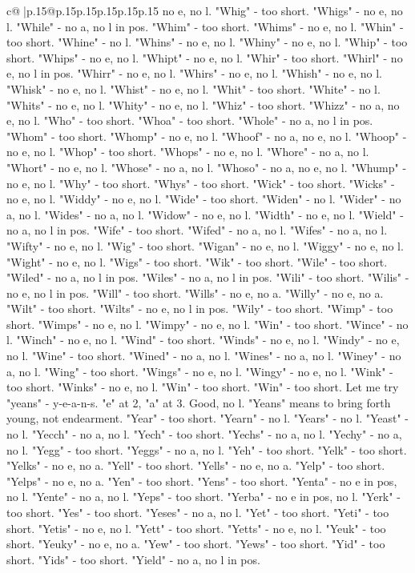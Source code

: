 \documentclass{article}
\begin{document}
{\begin{supertabular}{c@{$\;$}|p{.15\linewidth}@{}p{.15\linewidth}p{.15\linewidth}p{.15\linewidth}p{.15\linewidth}p{.15\linewidth}}
{{{no e, no l. "Whig" {-} too short. "Whigs" {-} no e, no l. "While" {-} no a, no l in pos. "Whim" {-} too short. "Whims" {-} no e, no l. "Whin" {-} too short. "Whine" {-} no l. "Whins" {-} no e, no l. "Whiny" {-} no e, no l. "Whip" {-} too short. "Whips" {-} no e, no l. "Whipt" {-} no e, no l. "Whir" {-} too short. "Whirl" {-} no e, no l in pos. "Whirr" {-} no e, no l. "Whirs" {-} no e, no l. "Whish" {-} no e, no l. "Whisk" {-} no e, no l. "Whist" {-} no e, no l. "Whit" {-} too short. "White" {-} no l. "Whits" {-} no e, no l. "Whity" {-} no e, no l. "Whiz" {-} too short. "Whizz" {-} no a, no e, no l. "Who" {-} too short. "Whoa" {-} too short. "Whole" {-} no a, no l in pos. "Whom" {-} too short. "Whomp" {-} no e, no l. "Whoof" {-} no a, no e, no l. "Whoop" {-} no e, no l. "Whop" {-} too short. "Whops" {-} no e, no l. "Whore" {-} no a, no l. "Whort" {-} no e, no l. "Whose" {-} no a, no l. "Whoso" {-} no a, no e, no l. "Whump" {-} no e, no l. "Why" {-} too short. "Whys" {-} too short. "Wick" {-} too short. "Wicks" {-} no e, no l. "Widdy" {-} no e, no l. "Wide" {-} too short. "Widen" {-} no l. "Wider" {-} no a, no l. "Wides" {-} no a, no l. "Widow" {-} no e, no l. "Width" {-} no e, no l. "Wield" {-} no a, no l in pos. "Wife" {-} too short. "Wifed" {-} no a, no l. "Wifes" {-} no a, no l. "Wifty" {-} no e, no l. "Wig" {-} too short. "Wigan" {-} no e, no l. "Wiggy" {-} no e, no l. "Wight" {-} no e, no l. "Wigs" {-} too short. "Wik" {-} too short. "Wile" {-} too short. "Wiled" {-} no a, no l in pos. "Wiles" {-} no a, no l in pos. "Wili" {-} too short. "Wilis" {-} no e, no l in pos. "Will" {-} too short. "Wills" {-} no e, no a. "Willy" {-} no e, no a. "Wilt" {-} too short. "Wilts" {-} no e, no l in pos. "Wily" {-} too short. "Wimp" {-} too short. "Wimps" {-} no e, no l. "Wimpy" {-} no e, no l. "Win" {-} too short. "Wince" {-} no l. "Winch" {-} no e, no l. "Wind" {-} too short. "Winds" {-} no e, no l. "Windy" {-} no e, no l. "Wine" {-} too short. "Wined" {-} no a, no l. "Wines" {-} no a, no l. "Winey" {-} no a, no l. "Wing" {-} too short. "Wings" {-} no e, no l. "Wingy" {-} no e, no l. "Wink" {-} too short. "Winks" {-} no e, no l. "Win" {-} too short. "Win" {-} too short. Let me try "yeans" {-} y{-}e{-}a{-}n{-}s. "e" at 2, "a" at 3. Good, no l. "Yeans" means to bring forth young, not endearment. "Year" {-} too short. "Yearn" {-} no l. "Years" {-} no l. "Yeast" {-} no l. "Yecch" {-} no a, no l. "Yech" {-} too short. "Yechs" {-} no a, no l. "Yechy" {-} no a, no l. "Yegg" {-} too short. "Yeggs" {-} no a, no l. "Yeh" {-} too short. "Yelk" {-} too short. "Yelks" {-} no e, no a. "Yell" {-} too short. "Yells" {-} no e, no a. "Yelp" {-} too short. "Yelps" {-} no e, no a. "Yen" {-} too short. "Yens" {-} too short. "Yenta" {-} no e in pos, no l. "Yente" {-} no a, no l. "Yeps" {-} too short. "Yerba" {-} no e in pos, no l. "Yerk" {-} too short. "Yes" {-} too short. "Yeses" {-} no a, no l. "Yet" {-} too short. "Yeti" {-} too short. "Yetis" {-} no e, no l. "Yett" {-} too short. "Yetts" {-} no e, no l. "Yeuk" {-} too short. "Yeuky" {-} no e, no a. "Yew" {-} too short. "Yews" {-} too short. "Yid" {-} too short. "Yids" {-} too short. "Yield" {-} no a, no l in pos. }}}
\end{supertabular}}
\end{document}

